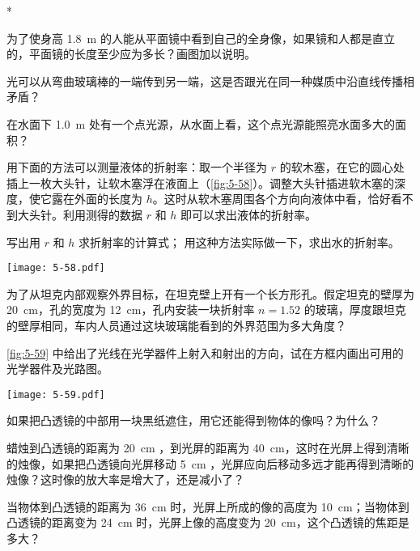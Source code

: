 \begin{Exercise}*
\begin{question}
  \item 为了使身高 \qty{1.8}{m} 的人能从平面镜中看到自己的全身像，如果镜和人都是直立的，平面镜的长度至少应为多长？画图加以说明。
  \item 光可以从弯曲玻璃棒的一端传到另一端，这是否跟光在同一种媒质中沿直线传播相矛盾？
  \item 在水面下 \qty{1.0}{m} 处有一个点光源，从水面上看，这个点光源能照亮水面多大的面积？
  \item 用下面的方法可以测量液体的折射率：取一个半径为 $r$ 的软木塞，在它的圆心处插上一枚大头针，让软木塞浮在液面上（\cref{fig:5-58}）。调整大头针插进软木塞的深度，使它露在外面的长度为 $h$。这时从软木塞周围各个方向向液体中看，恰好看不到大头针。利用测得的数据 $r$ 和 $h$ 即可以求出液体的折射率。
  \begin{tasks}
    \task 写出用 $r$ 和 $h$ 求折射率的计算式；
    \task 用这种方法实际做一下，求出水的折射率。
  \end{tasks}
  \begin{figurehere}
    \begin{minipage}{\linewidth}\centering
      \texttt{[image: 5-58.pdf]}
      \caption{}\label{fig:5-58}
    \end{minipage}
  \end{figurehere}
  \item 为了从坦克内部观察外界目标，在坦克壁上开有一个长方形孔。假定坦克的壁厚为 \qty{20}{cm}，孔的宽度为 \qty{12}{cm}，孔内安装一块折射率 $n=1.52$ 的玻璃，厚度跟坦克的壁厚相同，车内人员通过这块玻璃能看到的外界范围为多大角度？
  \item \cref{fig:5-59} 中给出了光线在光学器件上射入和射出的方向，试在方框内画出可用的光学器件及光路图。
  \begin{figurehere}
    \begin{minipage}{\linewidth}\centering
      \texttt{[image: 5-59.pdf]}
      \caption{}\label{fig:5-59}
    \end{minipage}
  \end{figurehere}
  \item 如果把凸透镜的中部用一块黑纸遮住，用它还能得到物体的像吗？为什么？
  \item 蜡烛到凸透镜的距离为 \qty{20}{cm} ，到光屏的距离为 \qty{40}{cm}，这时在光屏上得到清晰的烛像，如果把凸透镜向光屏移动 \qty{5}{cm} ，光屏应向后移动多远才能再得到清晰的烛像？这时像的放大率是增大了，还是减小了？
  \item 当物体到凸透镜的距离为 \qty{36}{cm} 时，光屏上所成的像的高度为 \qty{10}{cm}；当物体到凸透镜的距离变为 \qty{24}{cm} 时，光屏上像的高度变为 \qty{20}{cm}，这个凸透镜的焦距是多大？

\end{question}
\end{Exercise}

